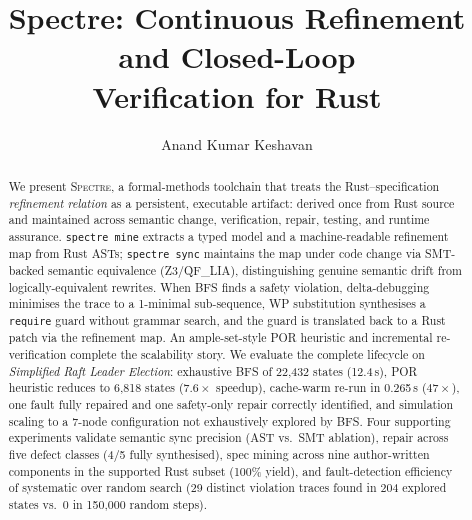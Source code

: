 \documentclass[runningheads]{../paper-vmcai-2027/llncs}
\begin{document}
\title{Spectre: Continuous Refinement and Closed-Loop\\Verification for Rust}

\author{Anand Kumar Keshavan}


\maketitle

\begin{abstract}
We present \textsc{Spectre}, a formal-methods toolchain that treats the
Rust--specification \emph{refinement relation} as a persistent, executable
artifact: derived once from Rust source and maintained across semantic change,
verification, repair, testing, and runtime assurance.
\texttt{spectre mine} extracts a typed model and a machine-readable
refinement map from Rust ASTs; \texttt{spectre sync} maintains the map under
code change via SMT-backed semantic equivalence (Z3/QF\_LIA), distinguishing
genuine semantic drift from logically-equivalent rewrites.
When BFS finds a safety violation, delta-debugging minimises the trace to a
1-minimal sub-sequence, WP substitution synthesises a \texttt{require} guard
without grammar search, and the guard is translated back to a Rust patch via
the refinement map.
An ample-set-style POR heuristic and incremental re-verification complete the
scalability story.
We evaluate the complete lifecycle on \emph{Simplified Raft Leader Election}:
exhaustive BFS of 22{,}432 states (12.4\,s), POR heuristic reduces to 6{,}818
states ($7.6\times$ speedup), cache-warm re-run in 0.265\,s ($47\times$), one
fault fully repaired and one safety-only repair correctly identified, and
simulation scaling to a 7-node configuration not exhaustively explored by BFS.
Four supporting experiments validate semantic sync precision (AST vs.\ SMT
ablation), repair across five defect classes (4/5 fully synthesised), spec
mining across nine author-written components in the supported Rust subset (100\%
yield), and fault-detection efficiency of systematic over random search
(29 distinct violation traces found in 204 explored states vs.\ 0 in
150{,}000 random steps).
\end{abstract}
\end{document}
